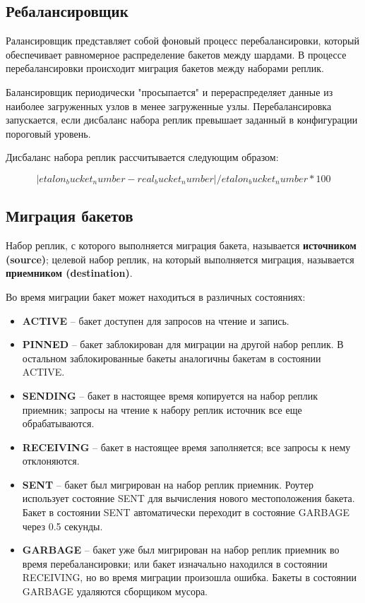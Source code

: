\subsection{Ребалансировщик}

Ралансировщик представляет собой фоновый процесс перебалансировки, который
обеспечивает равномерное распределение бакетов между шардами. В процессе
перебалансировки происходит миграция бакетов между наборами реплик.

Балансировщик периодически "просыпается" и перераспределяет данные из наиболее
загруженных узлов в менее загруженные узлы. Перебалансировка запускается, если
дисбаланс набора реплик превышает заданный в конфигурации пороговый уровень.

Дисбаланс набора реплик рассчитывается следующим образом:

\begin{equation}
|etalon_bucket_number - real_bucket_number| / etalon_bucket_number * 100
\end{equation}

\subsection{Миграция бакетов}

Набор реплик, с которого выполняется миграция бакета, называется
\textbf{источником (source)}; целевой набор реплик, на который выполняется
миграция, называется \textbf{приемником (destination)}.

Во время миграции бакет может находиться в различных состояниях:

\begin{itemize}
\item \textbf{ACTIVE} -- бакет доступен для запросов на чтение и запись.
\item \textbf{PINNED} -- бакет заблокирован для миграции на другой набор
    реплик. В остальном заблокированные бакеты аналогичны бакетам в состоянии
        ACTIVE.
\item \textbf{SENDING} -- бакет в настоящее время копируется на набор реплик
    приемник; запросы на чтение к набору реплик источник все еще
        обрабатываются.
\item \textbf{RECEIVING} -- бакет в настоящее время заполняется; все запросы к
    нему отклоняются.
\item \textbf{SENT} -- бакет был мигрирован на набор реплик приемник. Роутер
    использует состояние SENT для вычисления нового местоположения бакета.
        Бакет в состоянии SENT автоматически переходит в состояние GARBAGE
        через 0.5 секунды.
\item \textbf{GARBAGE} -- бакет уже был мигрирован на набор реплик приемник во
    время перебалансировки; или бакет изначально находился в состоянии
        RECEIVING, но во время миграции произошла ошибка. Бакеты в состоянии
        GARBAGE удаляются сборщиком мусора.
\end{itemize}

